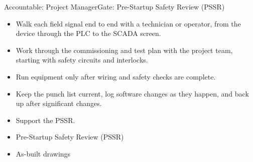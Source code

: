 \begin{stagecard}{Accountable: Project Manager}{Gate: Pre-Startup Safety Review (PSSR)}
\begin{itemize}[leftmargin=*,itemsep=1pt,topsep=2pt]
  \item Walk each field signal end to end with a technician or operator, from the device through the PLC to the SCADA screen.
  \item Work through the commissioning and test plan with the project team, starting with safety circuits and interlocks.
  \item Run equipment only after wiring and safety checks are complete.
  \item Keep the punch list current, log software changes as they happen, and back up after significant changes.
  \item Support the PSSR.
\end{itemize}
\tcbline
{}\par
\begin{itemize}[leftmargin=*,itemsep=1pt,topsep=2pt]
  \item Pre-Startup Safety Review (PSSR)
  \item As-built drawings
\end{itemize}
\tcbline
{}
\end{stagecard}

